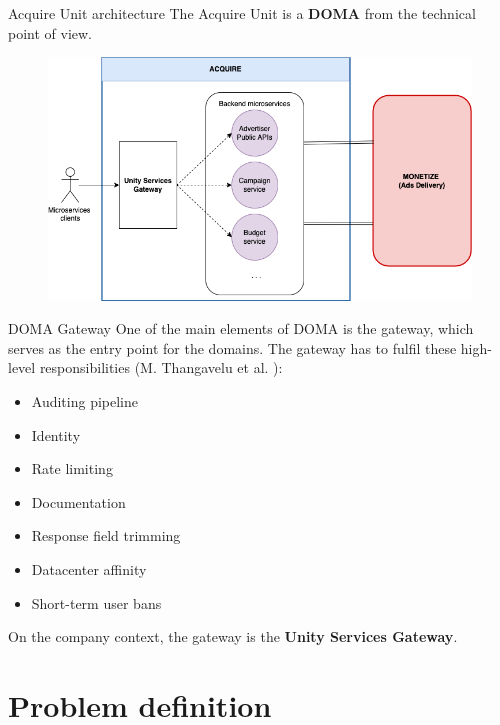 \documentclass[10pt]{beamer}
\begin{document}
\begin{frame}{Acquire Unit architecture}
    The Acquire Unit is a \textbf{DOMA} from the technical point of view.
    
    \begin{figure}
        \centering
        \includegraphics[scale=0.27]{src/thesis/img/background/acquire-division.png}
        \label{fig:my_label}
    \end{figure}
\end{frame}

\begin{frame}{DOMA Gateway}
    One of the main elements of DOMA is the gateway, which serves as the entry point for the domains. The gateway has to fulfil these high-level responsibilities (M. Thangavelu et al. \cite{UberGateway}):
    
    \begin{itemize}
        \item Auditing pipeline
        \item Identity
        \item Rate limiting
        \item Documentation
        \item Response field trimming
        \item Datacenter affinity
        \item Short-term user bans
    \end{itemize}
    
    On the company context, the gateway is the \textbf{Unity Services Gateway}.
\end{frame}

\section{Problem definition}
\end{document}
